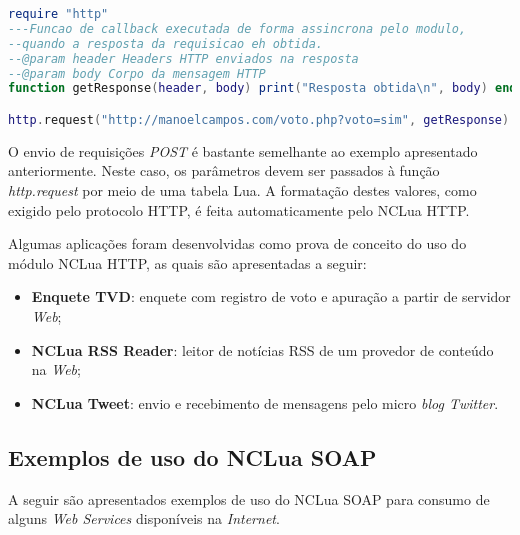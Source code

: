 \begin{lstlisting}[caption=Exemplo de envio de requisição GET com NCLua HTTP, label=list:ncluahttp2, language=lua]
require "http"
---Funcao de callback executada de forma assincrona pelo modulo, 
--quando a resposta da requisicao eh obtida.
--@param header Headers HTTP enviados na resposta
--@param body Corpo da mensagem HTTP
function getResponse(header, body) print("Resposta obtida\n", body) end

http.request("http://manoelcampos.com/voto.php?voto=sim", getResponse)
\end{lstlisting}

O envio de requisições \textit{POST} é bastante semelhante ao exemplo apresentado anteriormente. 
Neste caso, os parâmetros devem ser passados à função \textit{http.request} por meio
de uma tabela Lua. A formatação destes valores, como exigido pelo protocolo HTTP, é feita automaticamente pelo NCLua HTTP.

Algumas aplicações foram desenvolvidas como prova de conceito do uso do módulo NCLua HTTP,
as quais são apresentadas a seguir:

\begin{itemize} 
	\item \textbf{Enquete TVD}: enquete com registro de voto e apuração a partir de servidor \textit{Web};
  \item \textbf{NCLua RSS Reader}: leitor de notícias RSS de um provedor de conteúdo na \textit{Web};
  \item \textbf{NCLua Tweet}: envio e recebimento de mensagens pelo micro \textit{blog Twitter}.
\end{itemize}

\subsection{Exemplos de uso do NCLua SOAP} \label{sec:apps-ncluasoap}

A seguir são apresentados exemplos de uso do NCLua SOAP para consumo de alguns \textit{Web Services}
disponíveis na \textit{Internet}.

